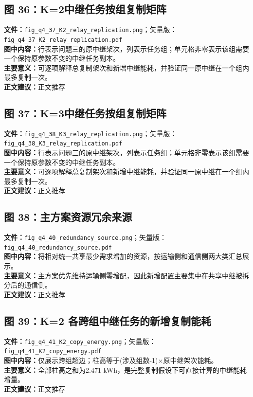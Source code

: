 \subsection*{图 36：K=2中继任务按组复制矩阵}
\textbf{文件：}\texttt{fig\_q4\_37\_K2\_relay\_replication.png}；矢量版：\texttt{fig\_q4\_37\_K2\_relay\_replication.pdf}\\
\textbf{图中内容：}行表示问题三的原中继架次，列表示任务组；单元格非零表示该组需要一个保持原参数不变的中继任务副本。\\
\textbf{主要意义：}可逐项解释总复制架次和新增中继能耗，并验证同一原中继在一个组内最多复制一次。\\
\textbf{正文建议：}正文推荐

\subsection*{图 37：K=3中继任务按组复制矩阵}
\textbf{文件：}\texttt{fig\_q4\_38\_K3\_relay\_replication.png}；矢量版：\texttt{fig\_q4\_38\_K3\_relay\_replication.pdf}\\
\textbf{图中内容：}行表示问题三的原中继架次，列表示任务组；单元格非零表示该组需要一个保持原参数不变的中继任务副本。\\
\textbf{主要意义：}可逐项解释总复制架次和新增中继能耗，并验证同一原中继在一个组内最多复制一次。\\
\textbf{正文建议：}正文推荐

\subsection*{图 38：主方案资源冗余来源}
\textbf{文件：}\texttt{fig\_q4\_40\_redundancy\_source.png}；矢量版：\texttt{fig\_q4\_40\_redundancy\_source.pdf}\\
\textbf{图中内容：}将相对统一共享最少需求增加的资源，按运输侧和通信侧两大类汇总展示。\\
\textbf{主要意义：}主方案优先维持运输侧零增配，因此新增配置主要集中在共享中继被拆分后的通信侧。\\
\textbf{正文建议：}正文推荐

\subsection*{图 39：K=2 各跨组中继任务的新增复制能耗}
\textbf{文件：}\texttt{fig\_q4\_41\_K2\_copy\_energy.png}；矢量版：\texttt{fig\_q4\_41\_K2\_copy\_energy.pdf}\\
\textbf{图中内容：}仅展示跨组超边；柱高等于(涉及组数-1)×原中继架次能耗。\\
\textbf{主要意义：}全部柱高之和为2.471 kWh，是完整复制假设下可直接计算的中继能耗增量。\\
\textbf{正文建议：}正文推荐

